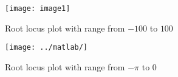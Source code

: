 \begin{figure}
    \centering
    \begin{subfigure}{.5\textwidth}
      \centering
      \texttt{[image: image1]}
      \caption{Root locus plot with range from $-100$ to $100$}
      \label{fig:sub1}
    \end{subfigure}%
    \begin{subfigure}{.5\textwidth}
      \centering
      \texttt{[image: ../matlab/]}
      \caption{Root locus plot with range from $-\pi$ to $0$}
      \label{fig:root_locus_proper_range}
    \end{subfigure}
    \caption{}
    \label{fig:root_locus}
\end{figure}
